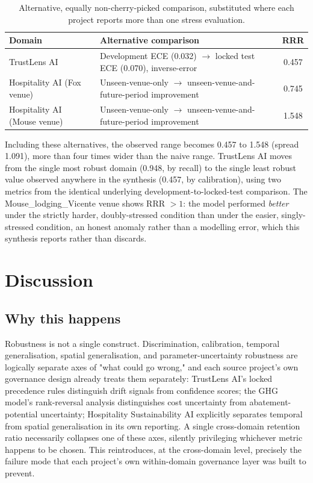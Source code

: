 \documentclass[11pt]{article}
\begin{document}
\begin{table}[h]
\centering
\caption{Alternative, equally non-cherry-picked comparison, substituted where each project reports more than one stress evaluation.}
\begin{tabular}{@{}p{5cm}p{6cm}c@{}}
\toprule
\textbf{Domain} & \textbf{Alternative comparison} & \textbf{RRR} \\
\midrule
TrustLens AI & Development ECE (0.032) $\to$ locked test ECE (0.070), inverse-error & 0.457 \\
Hospitality AI (Fox venue) & Unseen-venue-only $\to$ unseen-venue-and-future-period improvement & 0.745 \\
Hospitality AI (Mouse venue) & Unseen-venue-only $\to$ unseen-venue-and-future-period improvement & 1.548 \\
\bottomrule
\end{tabular}
\end{table}

Including these alternatives, the observed range becomes 0.457 to 1.548 (spread 1.091), more than four times wider than the naive range. TrustLens AI moves from the single most robust domain (0.948, by recall) to the single least robust value observed anywhere in the synthesis (0.457, by calibration), using two metrics from the identical underlying development-to-locked-test comparison. The Mouse\_lodging\_Vicente venue shows RRR $>1$: the model performed \emph{better} under the strictly harder, doubly-stressed condition than under the easier, singly-stressed condition, an honest anomaly rather than a modelling error, which this synthesis reports rather than discards.

\section{Discussion}

\subsection{Why this happens}

Robustness is not a single construct. Discrimination, calibration, temporal generalisation, spatial generalisation, and parameter-uncertainty robustness are logically separate axes of "what could go wrong," and each source project's own governance design already treats them separately: TrustLens AI's locked precedence rules distinguish drift signals from confidence scores; the GHG model's rank-reversal analysis distinguishes cost uncertainty from abatement-potential uncertainty; Hospitality Sustainability AI explicitly separates temporal from spatial generalisation in its own reporting. A single cross-domain retention ratio necessarily collapses one of these axes, silently privileging whichever metric happens to be chosen. This reintroduces, at the cross-domain level, precisely the failure mode that each project's own within-domain governance layer was built to prevent.
\end{document}
